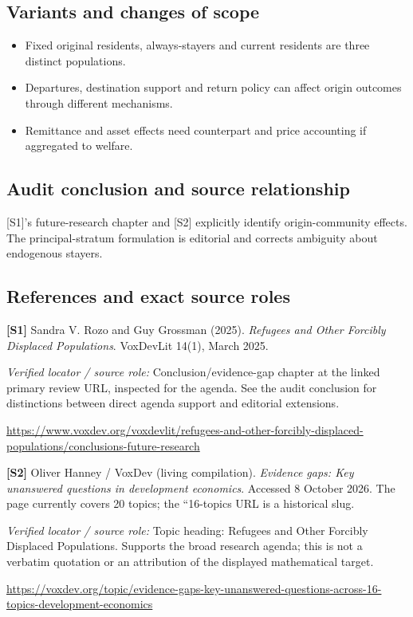 \documentclass[11pt,a4paper]{article}
\begin{document}
\subsection*{Variants and changes of scope}

\begin{itemize}
\item Fixed original residents, always-stayers and current residents are three distinct populations.
\item Departures, destination support and return policy can affect origin outcomes through different mechanisms.
\item Remittance and asset effects need counterpart and price accounting if aggregated to welfare.
\end{itemize}

\subsection*{Audit conclusion and source relationship}

[S1]'s future-research chapter and [S2] explicitly identify origin-community effects. The principal-stratum formulation is editorial and corrects ambiguity about endogenous stayers.

\subsection*{References and exact source roles}

{\footnotesize\raggedright
\par\noindent\textbf{[S1]} Sandra V. Rozo and Guy Grossman (2025). \emph{Refugees and Other Forcibly Displaced Populations}. VoxDevLit 14(1), March 2025.\par \textit{Verified locator / source role:} Conclusion/evidence-gap chapter at the linked primary review URL, inspected for the agenda. See the audit conclusion for distinctions between direct agenda support and editorial extensions.\par \url{https://www.voxdev.org/voxdevlit/refugees-and-other-forcibly-displaced-populations/conclusions-future-research}\par\smallskip
\par\noindent\textbf{[S2]} Oliver Hanney / VoxDev (living compilation). \emph{Evidence gaps: Key unanswered questions in development economics}. Accessed 8 October 2026. The page currently covers 20 topics; the ``16-topics URL is a historical slug.\par \textit{Verified locator / source role:} Topic heading: Refugees and Other Forcibly Displaced Populations. Supports the broad research agenda; this is not a verbatim quotation or an attribution of the displayed mathematical target.\par \url{https://voxdev.org/topic/evidence-gaps-key-unanswered-questions-across-16-topics-development-economics}\par\smallskip
}
\end{document}
